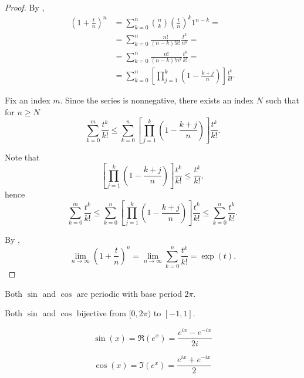 \begin{proof}
  \cite[3.31]{Rudin1976} By ,
  \begin{align*}
    \left(1 + \frac t n \right)^n
    &=
    \sum_{k=0}^n \binom{n}{k} \left(\frac t n\right)^k 1^{n-k}
    = \\ &=
    \sum_{k=0}^n \frac {n!} {(n-k)! k!} \frac {t^k} {n^k}
    = \\ &=
    \sum_{k=0}^n \frac {n!} {(n-k)! n^k} \frac {t^k} {k!}
    = \\ &=
    \sum_{k=0}^n \left[ \prod_{j=1}^k \left(1 - \frac {k+j} n \right) \right] \frac {t^k} {k!}.
  \end{align*}

  Fix an index \( m \). Since the series is nonnegative, there exists an index \( N \) such that for \( n \geq N \)
  \begin{equation*}
    \sum_{k=0}^m \frac {t^k} {k!}
    \leq
    \sum_{k=0}^n \left[ \prod_{j=1}^k \left(1 - \frac {k+j} n \right) \right] \frac {t^k} {k!}.
  \end{equation*}

  Note that
  \begin{equation*}
    \left[ \prod_{j=1}^k \left(1 - \frac {k+j} n \right) \right] \frac {t^k} {k!}
    \leq
    \frac {t^k} {k!},
  \end{equation*}
  hence
  \begin{equation*}
    \sum_{k=0}^m \frac {t^k} {k!}
    \leq
    \sum_{k=0}^n \left[ \prod_{j=1}^k \left(1 - \frac {k+j} n \right) \right] \frac {t^k} {k!}
    \leq
    \sum_{k=0}^n \frac {t^k} {k!}.
  \end{equation*}

  By ,
  \begin{equation*}
    \lim_{n \to \infty} \left(1 + \frac t n \right)^n
    =
    \lim_{n \to \infty} \sum_{k=0}^n \frac {t^k} {k!}
    =
    \exp(t).
  \end{equation*}
\end{proof}

\begin{proposition}\label{thm:trigonometric_function_properties}
  \mbox{}
  \begin{propenum}
     Both \( \sin \) and \( \cos \) are periodic with base period \( 2\pi \).

     Both \( \sin \) and \( \cos \) bijective from \( [0, 2\pi) \) to \( [-1, 1] \).

    \begin{equation*}
       \sin(x) = \Re(e^x) = \frac {e^{ix} - e^{-ix}} {2i}
    \end{equation*}

    \begin{equation*}
       \cos(x) = \Im(e^x) = \frac {e^{ix} + e^{-ix}} 2
    \end{equation*}
  \end{propenum}
\end{proposition}

